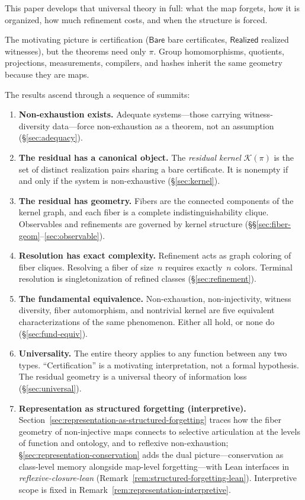 \documentclass[11pt,a4paper]{article}
\theoremstyle{plain}
\theoremstyle{definition}
\theoremstyle{remark}
\newcommand{\Bare}{\mathsf{Bare}}
\newcommand{\Real}{\mathsf{Realized}}
\newcommand{\compare}{\pi}
\newcommand{\Ker}{\mathcal{K}}
\begin{document}
\medskip
\noindent
This paper develops that universal theory in full: what the map forgets, how it is organized, how much refinement costs, and when the structure is forced.

The motivating picture is certification ($\Bare$ bare certificates, $\Real$ realized witnesses), but the theorems need only $\compare$. Group homomorphisms, quotients, projections, measurements, compilers, and hashes inherit the same geometry because they are maps.

The results ascend through a sequence of summits:

\begin{enumerate}[label=\textbf{Summit \Roman*.},leftmargin=*]
\item \textbf{Non-exhaustion exists.} Adequate systems---those carrying
      witness-diversity data---force non-exhaustion as a theorem, not an
      assumption (\S\ref{sec:adequacy}).
\item \textbf{The residual has a canonical object.} The \emph{residual kernel}
      $\Ker(\compare)$ is the set of distinct realization pairs sharing a bare
      certificate. It is nonempty if and only if the system is non-exhaustive
      (\S\ref{sec:kernel}).
\item \textbf{The residual has geometry.} Fibers are the connected components of
      the kernel graph, and each fiber is a complete indistinguishability clique.
      Observables and refinements are governed by kernel structure
      (\S\S\ref{sec:fiber-geom}--\ref{sec:observable}).
\item \textbf{Resolution has exact complexity.} Refinement acts as graph coloring
      of fiber cliques. Resolving a fiber of size~$n$ requires exactly~$n$ colors.
      Terminal resolution is singletonization of refined classes
      (\S\ref{sec:refinement}).
\item \textbf{The fundamental equivalence.} Non-exhaustion, non-injectivity,
      witness diversity, fiber automorphism, and nontrivial kernel are five
      equivalent characterizations of the same phenomenon. Either all hold, or
      none do (\S\ref{sec:fund-equiv}).
\item \textbf{Universality.} The entire theory applies to any function between
      any two types. ``Certification'' is a motivating interpretation, not a
      formal hypothesis. The residual geometry is a universal theory of
      information loss (\S\ref{sec:universal}).
\item \textbf{Representation as structured forgetting (interpretive).}
      Section~\ref{sec:representation-as-structured-forgetting} traces how the
      fiber geometry of non-injective maps connects to selective articulation
      at the levels of function and ontology, and to reflexive non-exhaustion;
      \S\ref{sec:representation-conservation} adds the dual picture---conservation
      as class-level memory alongside map-level forgetting---with Lean interfaces
      in \emph{reflexive-closure-lean} (Remark~\ref{rem:structured-forgetting-lean}).
      Interpretive scope is fixed in Remark~\ref{rem:representation-interpretive}.
\end{enumerate}
\end{document}
